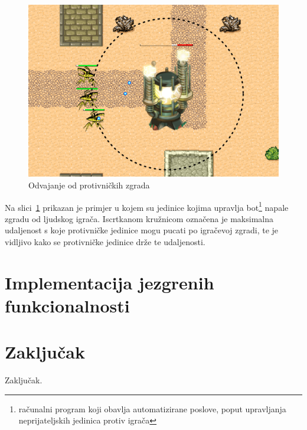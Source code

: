 \documentclass[times, utf8, zavrsni, numeric]{fer}
\begin{document}
\begin{figure}[h]
	\centering
	\includegraphics[width=0.8\linewidth]{images/boidsEnemySeparation.pdf}
	\caption{Odvajanje od protivničkih zgrada}
	\label{fig:boidsEnemySeparation}
\end{figure}

\par Na slici~\ref{fig:boidsEnemySeparation} prikazan je primjer u kojem su jedinice kojima upravlja bot\footnote{računalni program koji obavlja automatizirane poslove, poput upravljanja neprijateljskih jedinica protiv igrača} napale zgradu od ljudskog igrača.
Iscrtkanom kružnicom označena je maksimalna udaljenost s koje protivničke jedinice mogu pucati po igračevoj zgradi, te je vidljivo kako se protivničke jedinice drže te udaljenosti.

\chapter{Implementacija jezgrenih funkcionalnosti}\label{ch:implementation}

\chapter{Zaključak}\label{ch:conclusion}
Zaključak.



\end{document}
